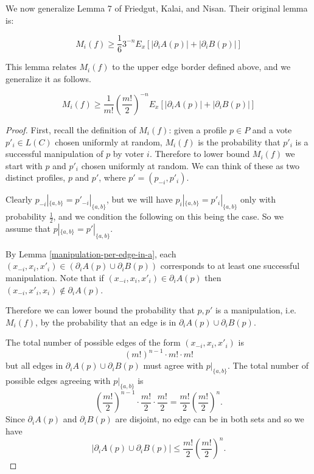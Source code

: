 	We now generalize Lemma 7 of Friedgut, Kalai, and Nisan. Their original lemma is:

	\begin{lemma}
		\[
			M_i(f) \ge \frac{1}{6} 3^{-n} E_x \left[|\partial_i A(p)| + |\partial_i B(p)| \right]
		\]
	\end{lemma}

	This lemma relates $M_i(f)$ to the upper edge border defined above, and we generalize it as follows.

	\begin{lemma}
		\label{friedgut-lemma-7}
		\[
			M_i(f) \ge \frac{1}{m!} \left(\frac{m!}{2}\right)^{-n} E_x \left[|\partial_i A(p)| + |\partial_i B(p)| \right]
		\]
	\end{lemma}

	\begin{proof}
		First, recall the definition of $M_i(f)$: given a profile $p \in P$ and a vote $p'_i \in L(C)$ chosen uniformly at random, $M_i(f)$ is the probability that $p'_i$ is a successful manipulation of $p$ by voter $i$. Therefore to lower bound $M_i(f)$ we start with $p$ and $p'_i$ chosen uniformly at random. We can think of these as two distinct profiles, $p$ and $p'$, where $p' = (p_{-i}, p'_i)$.

		Clearly $p_{-i}|_{\{a,b\}} = p'_{-i}|_{\{a,b\}}$, but we will have $p_i|_{\{a,b\}} = p'_i|_{\{a,b\}}$ only with probability $\frac{1}{2}$, and we condition the following on this being the case. So we assume that $p|_{\{a,b\}} = p'|_{\{a,b\}}$.

		By Lemma \ref{manipulation-per-edge-in-a}, each $(x_{-i}, x_i, x'_i) \in (\partial_i A(p) \cup \partial_i B(p))$ corresponds to at least one successful manipulation. Note that if $(x_{-i}, x_i, x'_i) \in \partial_i A(p)$ then $(x_{-i}, x'_i, x_i) \notin \partial_i A(p)$.

		Therefore we can lower bound the probability that $p, p'$ is a manipulation, i.e. $M_i(f)$, by the probability that an edge is in $\partial_i A(p) \cup \partial_i B(p)$.

		The total number of possible edges of the form $(x_{-i}, x_i, x'_i)$ is
		\[
			(m!)^{n-1} \cdot m! \cdot m!
		\]
		but all edges in $\partial_i A(p) \cup \partial_i B(p)$ must agree with $p|_{\{a, b\}}$. The total number of possible edges agreeing with $p|_{\{a, b\}}$ is
		\[
			\left(\frac{m!}{2}\right)^{n-1} \cdot \frac{m!}{2} \cdot \frac{m!}{2} = \frac{m!}{2}\left(\frac{m!}{2}\right)^{n}.
		\]
		Since $\partial_i A(p)$ and $\partial_i B(p)$ are disjoint, no edge can be in both sets and so we have
		\[
			|\partial_i A(p) \cup \partial_i B(p)| \le \frac{m!}{2}\left(\frac{m!}{2}\right)^{n}.
		\]


\end{proof}
